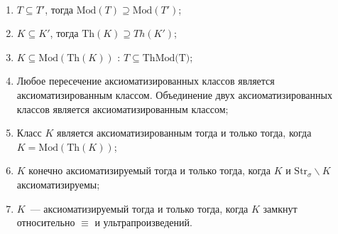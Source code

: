 \begin{prop} \ 

    \begin{enumerate}
        \item $T \subseteq T'$, тогда $\text{Mod}(T) \supseteq \text{Mod}(T')$; 
        \item $K \subseteq K'$, тогда $\text{Th}(K) \supseteq Th(K')$; 
        \item $K \subseteq \text{Mod}(\text{Th}(K))$ : $T \subseteq \text{Th}{\text{Mod(T)}}$; 
        \item Любое пересечение аксиоматизированных классов является аксиоматизированным классом. Объединение двух аксиоматизированных классов является аксиоматизированным классом; 
        \item Класс $K$ является аксиоматизированным тогда и только тогда, когда $K = \text{Mod}(\text{Th}(K))$; 
        \item $K$ конечно аксиоматизируемый тогда и только тогда, когда $K$ и $\text{Str}_\sigma \backslash K$ аксиоматизируемы; 
        \item $K$~— аксиоматизируемый тогда и только тогда, когда $K$ замкнут относительно $\equiv$ и ультрапроизведений.
    \end{enumerate}
\end{prop}

